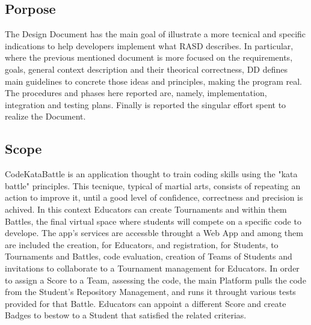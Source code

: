 \subsection*{Porpose}
The Design Document has the main goal of illustrate a more tecnical and specific indications to help developers implement what RASD describes. 
In particular, where the previous mentioned document is more focused on the requirements, goals, general context description and their theorical correctness, DD defines main guidelines to concrete those ideas and principles, making the program real. 
The procedures and phases here reported are, namely, implementation, integration and testing plans. Finally is reported the singular effort spent to realize the Document.
\subsection{Scope}
CodeKataBattle is an application thought to train coding skills using the "kata battle" principles. This tecnique, typical of martial arts, consists of repeating an action to improve it, until a good level of confidence, correctness and precision is achived.
In this context Educators can create Tournaments and within them Battles, the final virtual space where students will compete on a specific code to develope. The app's services are accessble throught a Web App and among them are included the creation, for Educators, and registration, for Students, to Tournaments and Battles, code evaluation, creation of Teams of Students and invitations to collaborate to a Tournament management for Educators. 
In order to assign a Score to a Team, assessing the code, the main Platform pulls the code from the Student's Repository Management, and runs it throught various tests provided for that Battle. Educators can appoint a different Score and create Badges to bestow to a Student that satisfied the related criterias.
